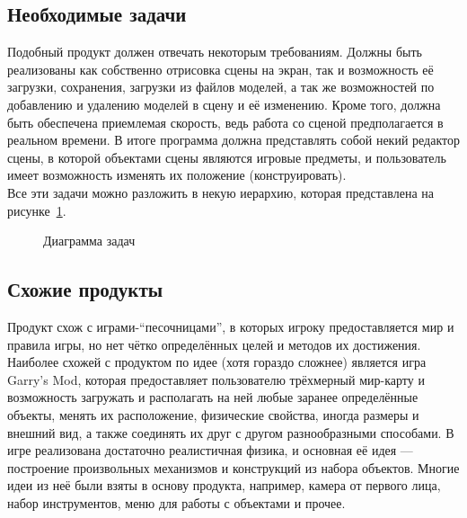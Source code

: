 \documentclass[a4paper,12pt]{report}
\numberwithin{equation}{section}
\begin{document}
\subsection{Необходимые задачи}
Подобный продукт должен отвечать некоторым требованиям. Должны быть реализованы как собственно отрисовка сцены на экран, так и возможность её загрузки, сохранения, загрузки из файлов моделей, а так же возможностей по добавлению и удалению моделей в сцену и её изменению. Кроме того, должна быть обеспечена приемлемая скорость, ведь работа со сценой предполагается в реальном времени. В итоге программа должна представлять собой некий редактор сцены, в которой объектами сцены являются игровые предметы, и пользователь имеет возможность изменять их положение (конструировать).  \\
Все эти задачи можно разложить в некую иерархию, которая представлена на рисунке~\ref{taskhierarchy}.

\begin{figure}[!h]
\centering
{}
\caption{Диаграмма задач}
\label{taskhierarchy}
\end{figure}

\subsection{Схожие продукты}
Продукт схож с играми-``песочницами'', в которых игроку предоставляется мир и правила игры, но нет чётко определённых целей и методов их достижения. Наиболее схожей с продуктом по идее (хотя гораздо сложнее) является игра Garry's Mod, которая предоставляет пользователю трёхмерный мир-карту и возможность загружать и располагать на ней любые заранее определённые объекты, менять их расположение, физические свойства, иногда размеры и внешний вид, а также соединять их друг с другом разнообразными способами. В игре реализована достаточно реалистичная физика, и основная её идея --- построение произвольных механизмов и конструкций из набора объектов. Многие идеи из неё были взяты в основу продукта, например, камера от первого лица, набор инструментов, меню для работы с объектами и прочее.
\end{document}
